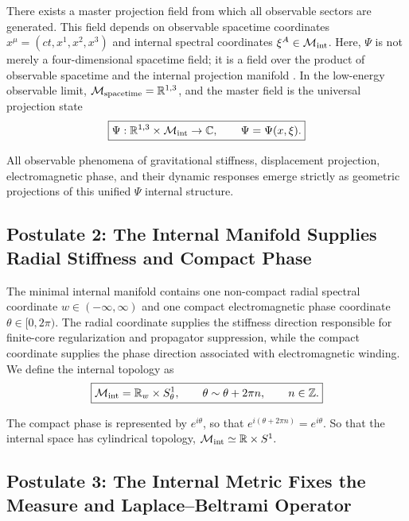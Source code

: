 \documentclass[11pt]{article}
\begin{document}
There exists a master projection field from which all observable sectors are generated. This field depends on observable spacetime coordinates \(x^\mu=(ct,x^1,x^2,x^3)\) and internal spectral coordinates \(\xi^A\in\mathcal M_{\rm int}\). Here, \(\Psi\) is not merely a four-dimensional spacetime field; it is a field over the product of observable spacetime and the internal projection manifold \cite{Steenrod1951, KobayashiNomizu1963}. In the low-energy observable limit, \(\mathcal M_{\rm spacetime}=\mathbb R^{1,3}\), and the master field is the universal projection state
\begin{equation}
\boxed{
\Psi:
\mathbb R^{1,3}
\times
\mathcal M_{\rm int}
\rightarrow
\mathbb C,
\qquad
\Psi=\Psi(x,\xi).
}
\end{equation}

All observable phenomena of gravitational stiffness, displacement projection, electromagnetic phase, and their dynamic responses emerge strictly as geometric projections of this unified \(\Psi\) internal structure.

\subsection{Postulate 2: The Internal Manifold Supplies Radial Stiffness and Compact Phase}
\label{sec:postulate_internal_manifold_radial_stiffness_compact_phase}

The minimal internal manifold contains one non-compact radial spectral coordinate \(w\in(-\infty,\infty)\) and one compact electromagnetic phase coordinate \(\theta\in[0,2\pi)\). The radial coordinate supplies the stiffness direction responsible for finite-core regularization and propagator suppression, while the compact coordinate supplies the phase direction associated with electromagnetic winding. We define the internal topology as
\begin{equation}
\boxed{
\mathcal M_{\rm int}
=
\mathbb R_w
\times
S^1_\theta,
\qquad
\theta\sim\theta+2\pi n,
\qquad
n\in\mathbb Z.
}
\end{equation}

The compact phase is represented by \(e^{i\theta}\), so that \(e^{i(\theta+2\pi n)}=e^{i\theta}\). So that the internal space has cylindrical topology, \(\mathcal M_{\rm int}\simeq\mathbb R\times S^1.
\)

\subsection{Postulate 3: The Internal Metric Fixes the Measure and Laplace--Beltrami Operator}
\label{sec:postulate_internal_metric_measure_laplacian}
\end{document}
